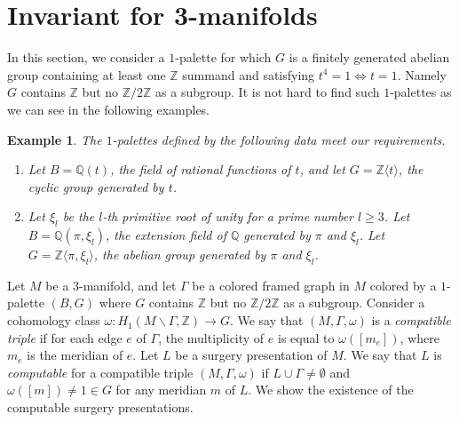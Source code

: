 \documentclass[12pt]{amsart}
\newtheorem{ex}[theo]{Example}
\begin{document}
\medskip

\section{Invariant for 3-manifolds}
In this section, we consider a $1$-palette for which $G$ is a finitely generated abelian group containing at least one $\mathbb{Z}$ summand and satisfying $t^4=1 \iff t=1$. Namely $G$ contains $\mathbb{Z}$ but no $\mathbb{Z}/2\mathbb{Z}$ as a subgroup. It is not hard to find such $1$-palettes as we can see in the following examples.

\begin{ex}
\label{palette}
The $1$-palettes defined by the following data meet our requirements.
\begin{enumerate}
\item Let $B=\mathbb{Q}(t)$, the field of rational functions of $t$, and let $G=\mathbb{Z}\langle t \rangle$, the cyclic group generated by $t$.
\item Let $\xi_l$ be the $l$-th primitive root of unity for a prime number $l\geq 3$. Let $B=\mathbb{Q}(\pi, \xi_l)$, the extension field of $\mathbb{Q}$ generated by $\pi$ and $\xi_l$. Let $G=\mathbb{Z}\langle \pi, \xi_l \rangle$, the abelian group generated by $\pi$ and $\xi_l$. 
\end{enumerate}
\end{ex}

Let $M$ be a 3-manifold, and let $\Gamma$ be a colored framed graph in $M$ colored by a $1$-palette $(B, G)$ where $G$ contains $\mathbb{Z}$ but no $\mathbb{Z}/2\mathbb{Z}$ as a subgroup. Consider a cohomology class $\omega: H_{1}(M\backslash \Gamma, \mathbb{Z})\to G$. We say that $(M, \Gamma, \omega)$ is a {\it compatible triple} if for each edge $e$ of $\Gamma$, the multiplicity of $e$ is equal to $\omega([m_e])$, where $m_e$ is the meridian of $e$. Let $L$ be a surgery presentation of $M$. We say that $L$ is {\it computable} for a compatible triple $(M, \Gamma, \omega)$ if $L\cup \Gamma\neq\emptyset$ and $\omega ([m])\neq 1\in G$ for any meridian $m$ of $L$. We show the existence of the computable surgery presentations.
\end{document}
